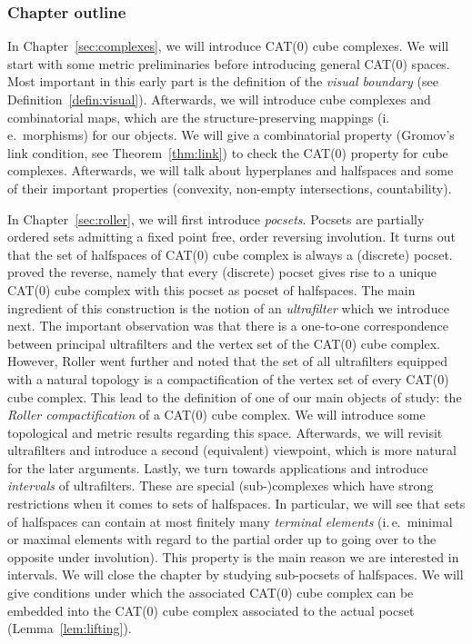 \subsubsection*{Chapter outline}

In Chapter~\ref{sec:complexes}, we will introduce CAT(0) cube complexes. We will start with some metric preliminaries before introducing general CAT(0) spaces. Most important in this early part is the definition of the \emph{visual boundary} (see Definition~\ref{defin:visual}). Afterwards, we will introduce cube complexes and combinatorial maps, which are the structure-preserving mappings (i.\,e.\ morphisms) for our objects. We will give a combinatorial property (Gromov's link condition, see Theorem~\ref{thm:link}) to check the CAT(0) property for cube complexes. Afterwards, we will talk about hyperplanes and halfspaces and some of their important properties (convexity, non-empty intersections, countability).

In Chapter~\ref{sec:roller}, we will first introduce \emph{pocsets}. Pocsets are partially ordered sets admitting a fixed point free, order reversing involution. It turns out that the set of halfspaces of CAT(0) cube complex is always a (discrete) pocset. \textcite{Roller1999} proved the reverse, namely that every (discrete) pocset gives rise to a unique CAT(0) cube complex with this pocset as pocset of halfspaces. The main ingredient of this construction is the notion of an \emph{ultrafilter} which we introduce next. The important observation was that there is a one-to-one correspondence between principal ultrafilters and the vertex set of the CAT(0) cube complex. However, Roller went further and noted that the set of all ultrafilters equipped with a natural topology is a compactification of the vertex set of every CAT(0) cube complex. This lead to the definition of one of our main objects of study: the \emph{Roller compactification} of a CAT(0) cube complex. We will introduce some topological and metric results regarding this space. Afterwards, we will revisit ultrafilters and introduce a second (equivalent) viewpoint, which is more natural for the later arguments. Lastly, we turn towards applications and introduce \emph{intervals} of ultrafilters. These are special (sub-)complexes which have strong restrictions when it comes to sets of halfspaces. In particular, we will see that sets of halfspaces can contain at most finitely many \emph{terminal elements} (i.\,e.\ minimal or maximal elements with regard to the partial order up to going over to the opposite under involution). This property is the main reason we are interested in intervals. We will close the chapter by studying sub-pocsets of halfspaces. We will give conditions under which the associated CAT(0) cube complex can be embedded into the CAT(0) cube complex associated to the actual pocset (Lemma~\ref{lem:lifting}). 

